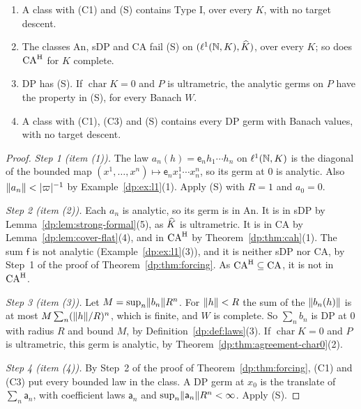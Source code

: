 \begin{proposition}\label{dp:prop:s-axiom}
\leavevmode
\begin{enumerate}
\item A class with \textup{(C1)} and \textup{(S)} contains Type I, over every $K$, with no target descent.
\item The classes An, sDP and CA fail \textup{(S)} on $(\ell^1(\mathbb N,K),\widehat K)$, over every $K$; so does $\mathrm{CA}^{\rm H}$ for $K$ complete.
\item DP has \textup{(S)}. If $\operatorname{char}K=0$ and $P$ is ultrametric, the analytic germs on $P$ have the property in \textup{(S)}, for every Banach $W$.
\item A class with \textup{(C1)}, \textup{(C3)} and \textup{(S)} contains every DP germ with Banach values, with no target descent.
\end{enumerate}
\end{proposition}

\begin{proof}
\emph{Step 1 (item (1)).} The law $a_n(h)=\mathsf e_nh_1\cdots h_n$ on $\ell^1(\mathbb N,K)$ is the diagonal of the bounded map $(x^1,\dots,x^n)\mapsto\mathsf e_nx^1_1\cdots x^n_n$, so its germ at $0$ is analytic. Also $\lVert a_n\rVert<\lvert \varpi\rvert^{-1}$ by Example~\ref{dp:ex:l1}(1). Apply (S) with $R=1$ and $a_0=0$.

\emph{Step 2 (item (2)).} Each $a_n$ is analytic, so its germ is in An. It is in sDP by Lemma~\ref{dp:lem:strong-formal}(5), as $\widehat K$ is ultrametric. It is in CA by Lemma~\ref{dp:lem:cover-flat}(4), and in $\mathrm{CA}^{\rm H}$ by Theorem~\ref{dp:thm:cah}(1). The sum $\mathsf f$ is not analytic (Example~\ref{dp:ex:l1}(3)), and it is neither sDP nor CA, by Step~1 of the proof of Theorem~\ref{dp:thm:forcing}. As $\mathrm{CA}^{\rm H}\subseteq\mathrm{CA}$, it is not in $\mathrm{CA}^{\rm H}$.

\emph{Step 3 (item (3)).} Let $M=\sup_n\lVert b_n\rVert R^n$. For $\lVert h\rVert<R$ the sum of the $\lVert b_n(h)\rVert$ is at most $M\sum_n(\lVert h\rVert/R)^n$, which is finite, and $W$ is complete. So $\sum_nb_n$ is DP at $0$ with radius $R$ and bound $M$, by Definition~\ref{dp:def:laws}(3). If $\operatorname{char}K=0$ and $P$ is ultrametric, this germ is analytic, by Theorem~\ref{dp:thm:agreement-char0}(2).

\emph{Step 4 (item (4)).} By Step~2 of the proof of Theorem~\ref{dp:thm:forcing}, (C1) and (C3) put every bounded law in the class. A DP germ at $x_0$ is the translate of $\sum_n\mathsf a_n$, with coefficient laws $\mathsf a_n$ and $\sup_n\lVert \mathsf a_n\rVert R^n<\infty$. Apply (S).
\end{proof}


